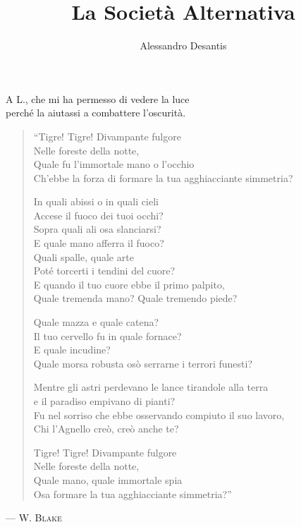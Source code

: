 \documentclass[a4paper,12pt]{book}
\title{La Società Alternativa}
\author{Alessandro Desantis}
\date{}
\begin{document}
\maketitle

\begin{flushright}
A L., che mi ha permesso di vedere la luce\\
perché la aiutassi a combattere l'oscurità.
\end{flushright}

\clearpage

\begin{verse}
\itshape{
``Tigre! Tigre! Divampante fulgore\\
Nelle foreste della notte,\\
Quale fu l'immortale mano o l'occhio\\
Ch'ebbe la forza di formare la tua agghiacciante simmetria?

In quali abissi o in quali cieli\\
Accese il fuoco dei tuoi occhi?\\
Sopra quali ali osa slanciarsi?\\
E quale mano afferra il fuoco?\\
Quali spalle, quale arte\\
Poté torcerti i tendini del cuore?\\
E quando il tuo cuore ebbe il primo palpito,\\
Quale tremenda mano? Quale tremendo piede?

Quale mazza e quale catena?\\
Il tuo cervello fu in quale fornace?\\
E quale incudine?\\
Quale morsa robusta osò serrarne i terrori funesti?

Mentre gli astri perdevano le lance tirandole alla terra\\
e il paradiso empivano di pianti?\\
Fu nel sorriso che ebbe osservando compiuto il suo lavoro,\\
Chi l'Agnello creò, creò anche te?

Tigre! Tigre! Divampante fulgore\\
Nelle foreste della notte,\\
Quale mano, quale immortale spia\\
Osa formare la tua agghiacciante simmetria?''
\/}
\end{verse}

\begin{flushright}
--- \scshape{W. Blake}
\end{flushright}
\end{document}
